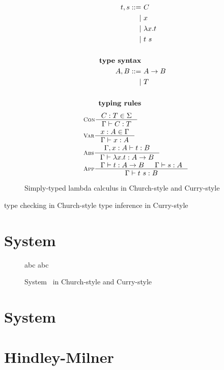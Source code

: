 \begin{figure}
\begin{singlespace}
\begin{minipage}{.46\textwidth}
\begin{align*}
t,s ::= &~ C           \\
      | &~ x           \\
      | &~ \lambda x    . t \\
      | &~ t ~ s       \\
\\
\textbf{type syntax} \\
A,B ::= &~ A -> B \\
      | &~ T      \\
\\
\textbf{typing rules}
\end{align*}
\vspace*{-1.5em}
\begin{align*}\quad
& \inference[\sc Con]{C:T \in \Sigma}{\Gamma |- C:T} \\
& \inference[\sc Var]{x:A \in \Gamma}{\Gamma |- x:A} \\
& \inference[\sc Abs]{\Gamma,x:A |- t : B}{\Gamma |- \lambda x   .t : A -> B} \\
& \inference[\sc App]{\Gamma |- t : A -> B & \Gamma |- s : A}{\Gamma |- t~s : B}
\end{align*}
\end{minipage}
\end{singlespace}
\caption{Simply-typed lambda calculus in Church-style and Curry-style}
\label{fig:stlc}
\end{figure}

type checking in Church-style
type inference in Curry-style

\section{System \F}
\begin{figure} \F
\begin{singlespace}
	abc
	abc
\caption{System \F\ in Church-style and Curry-style}
\label{fig:f}
\end{singlespace}
\end{figure}



\section{System \Fw}

\section{Hindley-Milner}
